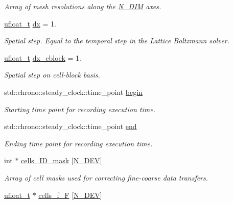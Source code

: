 \begin{DoxyCompactItemize}
\begin{DoxyCompactList}\small\item\em Array of mesh resolutions along the \hyperlink{cppspec_8h_a327d0faa306d7663502be8df312a815e}{N\+\_\+\+D\+IM} axes. \end{DoxyCompactList}\item 
\hyperlink{cppspec_8h_af529d360dfac9b9578aa719418a53a21}{ufloat\+\_\+t} \hyperlink{classMesh_a0886636d94a77389efde5dc9710e19d4}{dx} = 1.
\begin{DoxyCompactList}\small\item\em Spatial step. Equal to the temporal step in the Lattice Boltzmann solver. \end{DoxyCompactList}\item 
\hyperlink{cppspec_8h_af529d360dfac9b9578aa719418a53a21}{ufloat\+\_\+t} \hyperlink{classMesh_af2e2e3a1fab934787d6cf0c8330d933e}{dx\+\_\+cblock} = 1.
\begin{DoxyCompactList}\small\item\em Spatial step on cell-\/block basis. \end{DoxyCompactList}\item 
std\+::chrono\+::steady\+\_\+clock\+::time\+\_\+point \hyperlink{classMesh_abbb0713042b9f27770c38e728cee0386}{begin}
\begin{DoxyCompactList}\small\item\em Starting time point for recording execution time. \end{DoxyCompactList}\item 
std\+::chrono\+::steady\+\_\+clock\+::time\+\_\+point \hyperlink{classMesh_a415e46ae484ff88e5f23871c79285ad9}{end}
\begin{DoxyCompactList}\small\item\em Ending time point for recording execution time. \end{DoxyCompactList}\item 
int $\ast$ \hyperlink{classMesh_a1bfac9e480361bfdd0daf46ad6e8ca79}{cells\+\_\+\+I\+D\+\_\+mask} \mbox{[}\hyperlink{cppspec_8h_a2b674dab7a14f1bf32b48b7fda5022dc}{N\+\_\+\+D\+EV}\mbox{]}
\begin{DoxyCompactList}\small\item\em Array of cell masks used for correcting fine-\/coarse data transfers. \end{DoxyCompactList}\item 
\hyperlink{cppspec_8h_af529d360dfac9b9578aa719418a53a21}{ufloat\+\_\+t} $\ast$ \hyperlink{classMesh_af25ca4c4bc4150feb9b5d6652f8f8819}{cells\+\_\+f\+\_\+F} \mbox{[}\hyperlink{cppspec_8h_a2b674dab7a14f1bf32b48b7fda5022dc}{N\+\_\+\+D\+EV}\mbox{]}

\end{DoxyCompactItemize}
